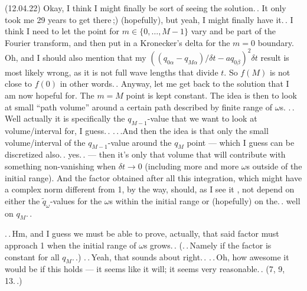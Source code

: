 \documentclass{report}
\begin{document}
(12.04.22) Okay, I think I might finally be sort of seeing the solution.\,. It only took me 29 years to get there\,;) (hopefully), but yeah, I might finally have it.\,. I think I need to let the point for $m\in\{0,\ldots,M-1\}$ vary and be part of the Fourier transform, and then put in a Kronecker's delta for the $m=0$ boundary. Oh, and I should also mention that my $((q_{0\alpha} - q_{M\alpha})/ \delta t - a q_{0\beta})^2\delta t$ result is most likely wrong, as it is not full wave lengths that divide $t$. So $f(M)$ is not close to $f(0)$ in other words.\,. Anyway, let me get back to the solution that I am now hopeful for. The $m=M$ point is kept constant. The idea is then to look at small ``path volume'' around a certain path described by finite range of $\omega$s. .\,.\,Well actually it is specifically the $q_{M-1}$-value that we want to look at volume/interval for, I guess.\,. .\,.\,.And then the idea is that only the small volume/interval of the $q_{M-1}$-value around the $q_M$ point --- which I guess can be discretized also.\,. yes.\,. --- then it's only that volume that will contribute with something non-vanishing when $\delta t\to 0$ (including more and more $\omega$s outside of the initial range). And the factor obtained after all this integration, which might have a complex norm different from 1, by the way, should, as I see it%
, not depend on either the $\tilde q_\omega$-values for the $\omega$s within the initial range or (hopefully) on the.\,. well on $q_M$.\,. %

.\,.\,Hm, and I guess we must be able to prove, actually, that said factor must approach 1 when the initial range of $\omega$s grows.\,. (.\,.\,Namely if the factor is constant for all $q_M$.\,.) .\,.\,Yeah, that sounds about right.\,. .\,.\,Oh, how awesome it would be if this holds --- it seems like it will; it seems very reasonable.\,. (7, 9, 13.\,.) %
\end{document}
